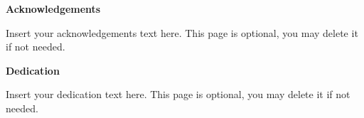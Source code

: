 \documentclass[12pt]{report}   %
\begin{document}
\renewcommand\contentsname{Table of Contents}

\begin{singlespace}
\tableofcontents
\end{singlespace}


\clearpage


\begin{singlespace}
	\setlength\cftbeforetabskip{\baselineskip}  %
	\listoftables
\end{singlespace}

\clearpage

\begin{singlespace}
\setlength\cftbeforefigskip{\baselineskip}  %
\listoffigures
\end{singlespace}

\clearpage



\clearpage
\begin{center}

\vspace*{5\baselineskip}
\textbf{\large Acknowledgements}
\end{center}


\begin{flushleft}
\hspace{10mm}Insert your acknowledgements text here. This page is optional, you may delete it if not needed. 
\end{flushleft}
\clearpage







\begin{center}

\vspace*{5\baselineskip}
\textbf{\large Dedication}
\end{center}


\begin{flushleft}
\hspace{10mm}Insert your dedication text here. This page is optional, you may delete it if not needed. 
\end{flushleft}
\end{document}
